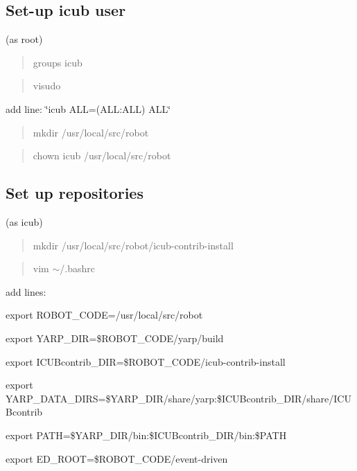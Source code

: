 \subsection*{Set-\/up icub user}

(as root)

\begin{quote}
groups icub \end{quote}


\begin{quote}
visudo \end{quote}



\begin{DoxyItemize}
\item add line\+: \char`\"{}icub A\+L\+L=(\+A\+L\+L\+:\+A\+L\+L) A\+L\+L\char`\"{}
\end{DoxyItemize}

\begin{quote}
mkdir /usr/local/src/robot \end{quote}


\begin{quote}
chown icub /usr/local/src/robot \end{quote}


\subsection*{Set up repositories}

(as icub)

\begin{quote}
mkdir /usr/local/src/robot/icub-\/contrib-\/install \end{quote}


\begin{quote}
vim $\sim$/.bashrc \end{quote}


add lines\+:


\begin{DoxyItemize}
\item export R\+O\+B\+O\+T\+\_\+\+C\+O\+DE=/usr/local/src/robot
\item export Y\+A\+R\+P\+\_\+\+D\+IR=\$\+R\+O\+B\+O\+T\+\_\+\+C\+O\+DE/yarp/build
\item export I\+C\+U\+Bcontrib\+\_\+\+D\+IR=\$\+R\+O\+B\+O\+T\+\_\+\+C\+O\+DE/icub-\/contrib-\/install
\item export Y\+A\+R\+P\+\_\+\+D\+A\+T\+A\+\_\+\+D\+I\+RS=\$\+Y\+A\+R\+P\+\_\+\+D\+IR/share/yarp\+:\$\+I\+C\+U\+Bcontrib\+\_\+\+D\+IR/share/\+I\+C\+U\+Bcontrib
\item export P\+A\+TH=\$\+Y\+A\+R\+P\+\_\+\+D\+IR/bin\+:\$\+I\+C\+U\+Bcontrib\+\_\+\+D\+IR/bin\+:\$\+P\+A\+TH
\item export E\+D\+\_\+\+R\+O\+OT=\$\+R\+O\+B\+O\+T\+\_\+\+C\+O\+DE/event-\/driven
\end{DoxyItemize}


